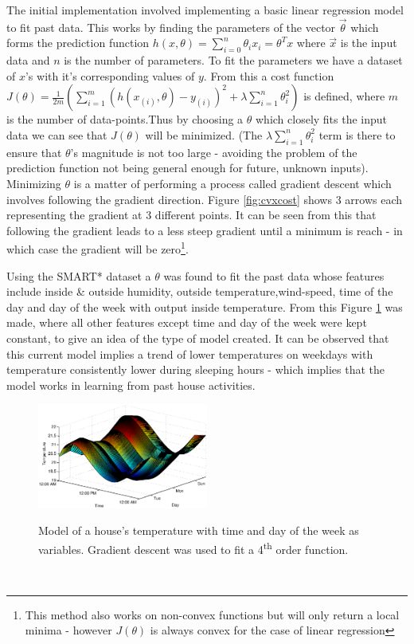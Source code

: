 \documentclass[10.5pt,a4paper,twoside]{report}   %
\begin{document}
The initial implementation involved implementing a basic linear regression model to fit past data. This works by finding the parameters of the vector $\vec{\theta}$ which forms the prediction function $h(x,\theta) = \sum\limits_{i=0}^n \theta_i x_i = \theta^T x$ where $\vec{x}$ is the input data and $n$ is the number of parameters. To fit the parameters we have a dataset of $x$'s with it's corresponding values of $y$. From this a cost function $J(\theta) = \frac{1}{2m} \left( \sum\limits_{i=1}^m \left( h(x_{(i)},\theta) -y_{(i)} \right)^2 +\lambda \sum\limits_{i=1}^n\theta_i^2 \right)$ is defined, where $m$ is the number of data-points.Thus by choosing a $\theta$ which closely fits the input data we can see that $J(\theta)$ will be minimized. (The $\lambda \sum\limits_{i=1}^n\theta_i^2$ term is there to ensure that $\theta$'s magnitude is not too large - avoiding the problem of the prediction function not being general enough for future, unknown inputs). Minimizing $\theta$ is a matter of performing a process called gradient descent which involves following the gradient direction. Figure \ref{fig:cvxcost} shows 3 arrows each representing the gradient at 3 different points. It can be seen from this that following the gradient leads to a less steep gradient until a minimum is reach - in which case the gradient will be zero\footnote{This method also works on non-convex functions but will only return a local minima - however $J(\theta)$ is always convex for the case of linear regression}.

Using the SMART* dataset a $\theta$ was found to fit the past data whose features include inside \& outside humidity, outside temperature,wind-speed, time of the day and day of the week with output inside temperature. From this Figure \ref{fig:linreg} was made, where all other features except time and day of the week were kept constant, to give an idea of the type of model created. It can be observed that this current model implies a trend of lower temperatures on weekdays with temperature consistently lower during sleeping hours - which implies that the model works in learning from past house activities.

\begin{figure}[h!]
  \vspace{-10pt}
  \caption{Model of a house's temperature with time and day of the week as variables. Gradient descent was used to fit a 4\textsuperscript{th} order function.}
  \centering
    \includegraphics[width=0.5\textwidth]{linreg.eps}
\label{fig:linreg}
  \vspace{-25pt}
\end{figure}
\
\end{document}
